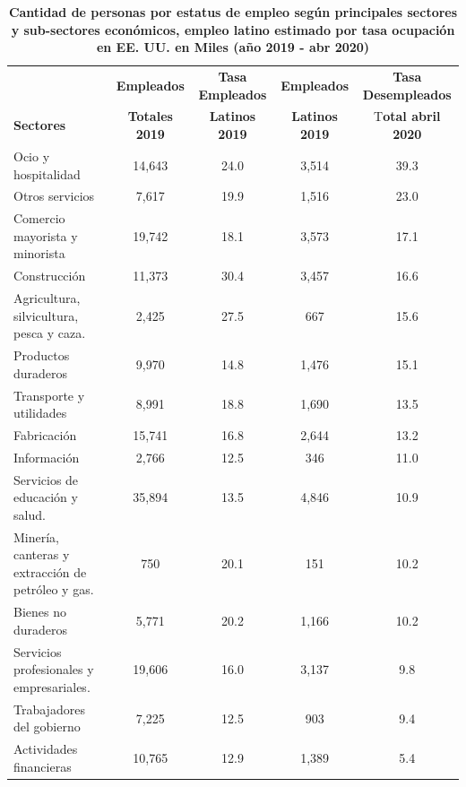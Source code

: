 \begin{table}[H]
	\centering
	\caption{\textbf{Cantidad de personas por estatus de empleo según principales sectores y sub-sectores económicos, empleo latino estimado por tasa ocupación en EE. UU. en Miles (año 2019 - abr 2020) }}
	\label{Tabla 4}
	\resizebox{17cm}{!} { 
		\begin{tabular}{lcccc} \toprule			
				&	\textbf{Empleados}	&	\textbf{Tasa Empleados} 	&	\textbf{Empleados}	&	\textbf{Tasa Desempleados}	\\ 
			\textbf{Sectores}	&	\textbf{Totales 2019}	&	\textbf{Latinos 2019}	&	\textbf{Latinos 2019}	&	T\textbf{otal abril 2020}	\\  \midrule
			Ocio y hospitalidad	&	14,643	&	24.0	&	3,514	&	39.3	\\ 
			Otros servicios	&	7,617	&	19.9	&	1,516	&	23.0	\\ 
			Comercio mayorista y minorista	&	19,742	&	18.1	&	3,573	&	17.1	\\ 
			Construcción	&	11,373	&	30.4	&	3,457	&	16.6	\\ 
			Agricultura, silvicultura, pesca y caza.	&	2,425	&	27.5	&	667	&	15.6	\\ 
			Productos duraderos	&	9,970	&	14.8	&	1,476	&	15.1	\\ 
			Transporte y utilidades	&	8,991	&	18.8	&	1,690	&	13.5	\\ 
			Fabricación	&	15,741	&	16.8	&	2,644	&	13.2	\\ 
			Información	&	2,766	&	12.5	&	346	&	11.0	\\ 
			Servicios de educación y salud.	&	35,894	&	13.5	&	4,846	&	10.9	\\ 
			Minería, canteras y extracción de petróleo y gas.	&	750	&	20.1	&	151	&	10.2	\\ 
			Bienes no duraderos	&	5,771	&	20.2	&	1,166	&	10.2	\\ 
			Servicios profesionales y empresariales.	&	19,606	&	16.0	&	3,137	&	9.8	\\ 
			Trabajadores del gobierno	&	7,225	&	12.5	&	903	&	9.4	\\ 
			Actividades financieras	&	10,765	&	12.9	&	1,389	&	5.4	\\  \bottomrule
			
			
			
						
		\end{tabular} 
		
	}
	{\small {}}
	
\end{table}

